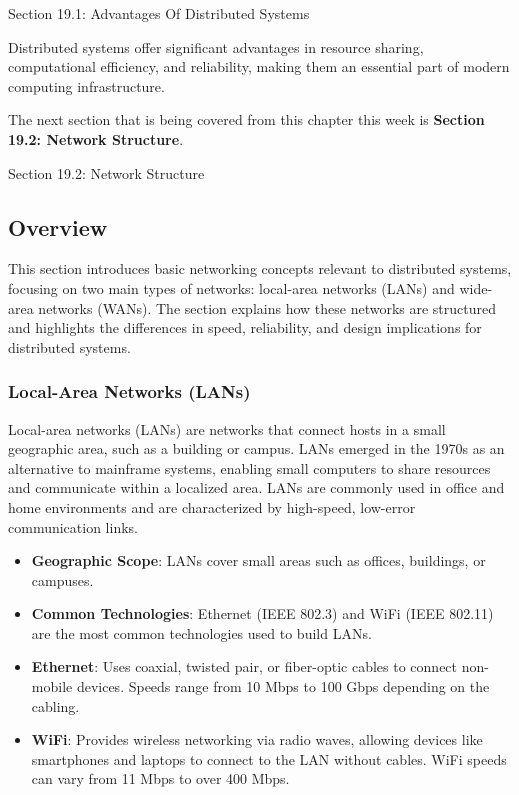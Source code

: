 \begin{notes}{Section 19.1: Advantages Of Distributed Systems}
\begin{highlight}
    Distributed systems offer significant advantages in resource sharing, computational efficiency, and reliability, making them an essential part of modern computing infrastructure.
    
    \end{highlight}
\end{notes}

The next section that is being covered from this chapter this week is \textbf{Section 19.2: Network Structure}.

\begin{notes}{Section 19.2: Network Structure}
    \subsection*{Overview}

    This section introduces basic networking concepts relevant to distributed systems, focusing on two main types of networks: local-area networks (LANs) and wide-area networks (WANs). The section 
    explains how these networks are structured and highlights the differences in speed, reliability, and design implications for distributed systems.
    
    \subsubsection*{Local-Area Networks (LANs)}
    
    Local-area networks (LANs) are networks that connect hosts in a small geographic area, such as a building or campus. LANs emerged in the 1970s as an alternative to mainframe systems, enabling 
    small computers to share resources and communicate within a localized area. LANs are commonly used in office and home environments and are characterized by high-speed, low-error communication links.
    
    \begin{highlight}
    
        \begin{itemize}
            \item \textbf{Geographic Scope}: LANs cover small areas such as offices, buildings, or campuses.
            \item \textbf{Common Technologies}: Ethernet (IEEE 802.3) and WiFi (IEEE 802.11) are the most common technologies used to build LANs.
            \item \textbf{Ethernet}: Uses coaxial, twisted pair, or fiber-optic cables to connect non-mobile devices. Speeds range from 10 Mbps to 100 Gbps depending on the cabling.
            \item \textbf{WiFi}: Provides wireless networking via radio waves, allowing devices like smartphones and laptops to connect to the LAN without cables. WiFi speeds can vary from 11 Mbps to over 400 Mbps.
        \end{itemize}
    

\end{highlight}
\end{notes}
